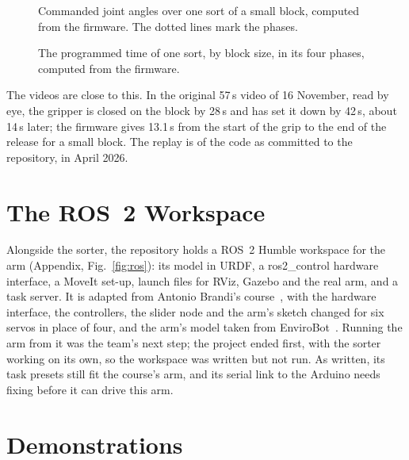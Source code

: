 \documentclass[11pt]{article}
\begin{document}
\begin{figure}[htbp]
  \centering
  \caption{Commanded joint angles over one sort of a small block, computed from the firmware. The dotted lines mark the phases.}
  \label{fig:angles}
\end{figure}

\begin{figure}[htbp]
  \centering
  \caption{The programmed time of one sort, by block size, in its four phases, computed from the firmware.}
  \label{fig:cycle}
\end{figure}

The videos are close to this. In the original 57\,s video of 16 November, read by eye, the gripper is closed on the block by 28\,s and has set it down by 42\,s, about 14\,s later; the firmware gives 13.1\,s from the start of the grip to the end of the release for a small block. The replay is of the code as committed to the repository, in April 2026.

\section{The ROS~2 Workspace}
\label{sec:ros}

Alongside the sorter, the repository holds a ROS~2 Humble workspace for the arm (Appendix, Fig.~\ref{fig:ros}): its model in URDF, a ros2\_control hardware interface, a MoveIt set-up, launch files for RViz, Gazebo and the real arm, and a task server. It is adapted from Antonio Brandi's course~\cite{brandi2023course}, with the hardware interface, the controllers, the slider node and the arm's sketch changed for six servos in place of four, and the arm's model taken from EnviroBot~\cite{envirobot2026}. Running the arm from it was the team's next step; the project ended first, with the sorter working on its own, so the workspace was written but not run. As written, its task presets still fit the course's arm, and its serial link to the Arduino needs fixing before it can drive this arm.

\section{Demonstrations}
\label{sec:demo}
\end{document}
